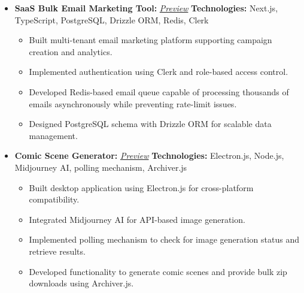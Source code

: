\documentclass[10pt,a4paper]{article}
\begin{document}
{\begin{itemize}[leftmargin=*, noitemsep]
    
    \item \textbf{SaaS Bulk Email Marketing Tool:} \hfill \textit{\href{https://github.com/abhijit47}{\color{blue}Preview}}
    \newline
    {\small \textbf{Technologies:} Next.js, TypeScript, PostgreSQL, Drizzle ORM, Redis, Clerk}
    \begin{itemize}[leftmargin=*, noitemsep, topsep=2pt]
        \item Built multi-tenant email marketing platform supporting campaign creation and analytics.
        \item Implemented authentication using Clerk and role-based access control.
        \item Developed Redis-based email queue capable of processing thousands of emails asynchronously while preventing rate-limit issues.
        \item Designed PostgreSQL schema with Drizzle ORM for scalable data management.
    \end{itemize}

    \item \textbf{Comic Scene Generator:} \hfill \textit{\href{https://github.com/abhijit47}{\color{blue}Preview}}
    \newline
    {\small \textbf{Technologies:} Electron.js, Node.js, Midjourney AI, polling mechanism, Archiver.js}
    \begin{itemize}[leftmargin=*, noitemsep, topsep=2pt]
        \item Built desktop application using Electron.js for cross-platform compatibility.
        \item Integrated Midjourney AI for API-based image generation.
        \item Implemented polling mechanism to check for image generation status and retrieve results.
        \item Developed functionality to generate comic scenes and provide bulk zip downloads using Archiver.js.
    \end{itemize}


\end{itemize}}
\end{document}
